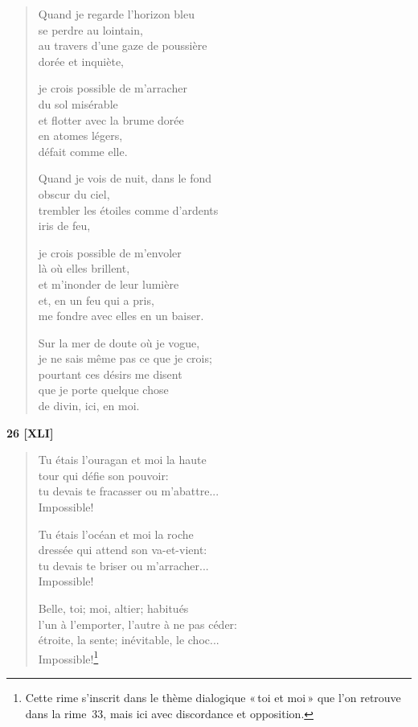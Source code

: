 \begin{verse}
  Quand je regarde l'horizon bleu \\
  se perdre au lointain, \\
  au travers d'une gaze de poussière \\
  dorée et inquiète,

  je crois possible de m'arracher \\
  du sol misérable \\
  et flotter avec la brume dorée \\
  en atomes légers, \\
  défait comme elle.

  Quand je vois de nuit, dans le fond \\
  obscur du ciel, \\
  trembler les étoiles comme d'ardents \\
  iris de feu,

  je crois possible de m'envoler \\
  là où elles brillent, \\
  et m'inonder de leur lumière \\
  et, en un feu qui a pris, \\
  me fondre avec elles en un baiser.

  Sur la mer de doute où je vogue, \\
  je ne sais même pas ce que je crois; \\
  pourtant ces désirs me disent \\
  que je porte quelque chose \\
  de divin, ici, en moi.
\end{verse}

\bigskip

\begin{center}
  \textbf{26 [XLI]}
\end{center}

\begin{verse}
  Tu étais l'ouragan et moi la haute \\
  tour qui défie son pouvoir: \\
  tu devais te fracasser ou m'abattre... \\
  Impossible!

  Tu étais l'océan et moi la roche \\
  dressée qui attend son va-et-vient: \\
  tu devais te briser ou m'arracher... \\
  Impossible!

  Belle, toi; moi, altier; habitués \\
  l'un à l'emporter, l'autre à ne pas céder: \\
  étroite, la sente; inévitable, le choc... \\
  Impossible!\footnote{Cette rime s'inscrit dans le thème dialogique
  «\,toi et moi\,» que l'on retrouve dans la rime~33, mais ici avec
  discordance et opposition.}
\end{verse}

